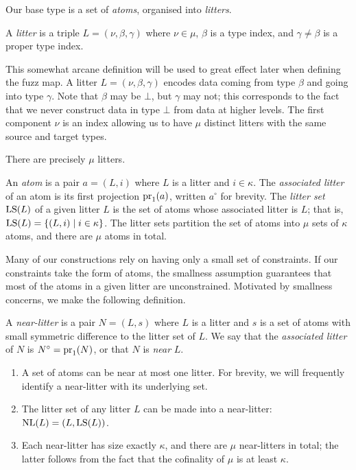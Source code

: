 Our base type is a set of \emph{atoms}, organised into \emph{litters}.
\begin{definition}
    A \emph{litter} is a triple \( L = (\nu, \beta, \gamma) \) where \( \nu \in \mu \), \( \beta \) is a type index, and \( \gamma \neq \beta \) is a proper type index.
\end{definition}
This somewhat arcane definition will be used to great effect later when defining the fuzz map.
A litter \( L = (\nu, \beta, \gamma) \) encodes data coming from type \( \beta \) and going into type \( \gamma \).
Note that \( \beta \) may be \( \bot \), but \( \gamma \) may not; this corresponds to the fact that we never construct data in type \( \bot \) from data at higher levels.
The first component \( \nu \) is an index allowing us to have \( \mu \) distinct litters with the same source and target types.
\begin{remark}
    There are precisely \( \mu \) litters.
\end{remark}
\begin{definition}
    An \emph{atom} is a pair \( a = (L, i) \) where \( L \) is a litter and \( i \in \kappa \).
    The \emph{associated litter} of an atom is its first projection \( \operatorname{pr}_1(a) \), written \( a^\circ \) for brevity.
    The \emph{litter set} \( \operatorname{LS}(L) \) of a given litter \( L \) is the set of atoms whose associated litter is \( L \); that is, \( \operatorname{LS}(L) = \{ (L, i) \mid i \in \kappa \} \).
    The litter sets partition the set of atoms into \( \mu \) sets of \( \kappa \) atoms, and there are \( \mu \) atoms in total.
\end{definition}
\begin{remark}
    Many of our constructions rely on having only a small set of constraints.
    If our constraints take the form of atoms, the smallness assumption guarantees that most of the atoms in a given litter are unconstrained.
    Motivated by smallness concerns, we make the following definition.
\end{remark}
\begin{definition}
    A \emph{near-litter} is a pair \( N = (L, s) \) where \( L \) is a litter and \( s \) is a set of atoms with small symmetric difference to the litter set of \( L \).
    We say that the \emph{associated litter} of \( N \) is \( N^\circ = \operatorname{pr}_1(N) \), or that \( N \) is \emph{near} \( L \).
\end{definition}
\begin{remarks}\mbox{\negthinspace}
    \label{rk:mk_near_litter}
    \begin{enumerate}
        \item A set of atoms can be near at most one litter.
        For brevity, we will frequently identify a near-litter with its underlying set.
        \item The litter set of any litter \( L \) can be made into a near-litter: \( \operatorname{NL}(L) = (L, \operatorname{LS}(L)) \).
        \item Each near-litter has size exactly \( \kappa \), and there are \( \mu \) near-litters in total; the latter follows from the fact that the cofinality of \( \mu \) is at least \( \kappa \).
    \end{enumerate}
\end{remarks}
